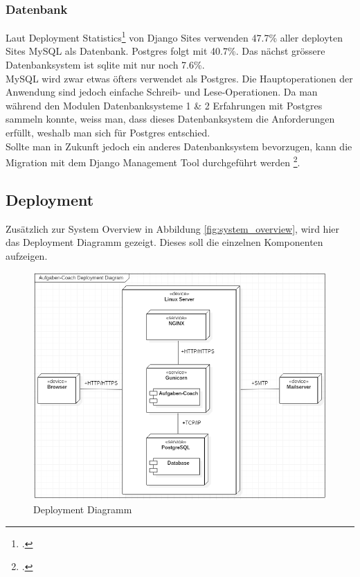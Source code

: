 \subsubsection*{Datenbank}
Laut Deployment Statistics\footcite{deploymentstatistics} von Django Sites verwenden 47.7\% aller deployten Sites MySQL als Datenbank. Postgres folgt mit 40.7\%. Das nächst grössere Datenbanksystem ist sqlite mit nur noch 7.6\%.\\

MySQL wird zwar etwas öfters verwendet als Postgres. Die Hauptoperationen der Anwendung sind jedoch einfache Schreib- und Lese-Operationen. Da man während den Modulen Datenbanksysteme 1 \& 2 Erfahrungen mit Postgres sammeln konnte, weiss man, dass dieses Datenbanksystem die Anforderungen erfüllt, weshalb man sich für Postgres entschied.\\

Sollte man in Zukunft jedoch ein anderes Datenbanksystem bevorzugen, kann die Migration mit dem Django Management Tool durchgeführt werden \footcite{dbmigration}. 

\newpage

\subsection{Deployment}
Zusätzlich zur System Overview in Abbildung \ref{fig:system_overview}, wird hier das Deployment Diagramm gezeigt. Dieses soll die einzelnen Komponenten aufzeigen.

\begin{figure}[H]
\begin{center}
	\includegraphics[width=\textwidth, keepaspectratio]{images/deployment_diagram.png}
	\caption{Deployment Diagramm}
	\label{fig:deployment_diagram}
\end{center}
\end{figure}


